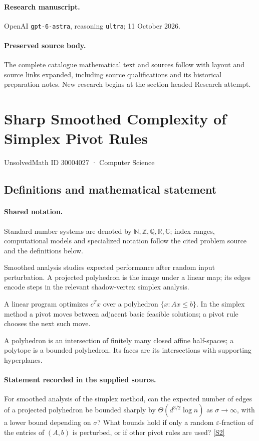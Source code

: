 \documentclass[11pt]{article}
\begin{document}
\paragraph{Research manuscript.} OpenAI \texttt{gpt-6-astra}, reasoning \texttt{ultra}; 11 October 2026.
\paragraph{Preserved source body.} The complete catalogue mathematical text and sources follow with layout and source links expanded, including source qualifications and its historical preparation notes. New research begins at the section headed Research attempt.

\section{Sharp Smoothed Complexity of Simplex Pivot Rules}\label{30004027}
{\small UnsolvedMath ID 30004027 · Computer Science}
\subsection{Definitions and mathematical statement}

\paragraph{Shared notation.}Standard number systems are denoted by $\mathbb N,\mathbb Z,\mathbb Q,\mathbb R,\mathbb C$; index ranges, computational models and specialized notation follow the cited problem source and the definitions below.


Smoothed analysis studies expected performance after random input perturbation. A projected polyhedron is the image under a linear map; its edges encode steps in the relevant shadow-vertex simplex analysis.

A linear program optimizes $c^Tx$ over a polyhedron $\{x:Ax\leq b\}$. In the simplex method a pivot moves between adjacent basic feasible solutions; a pivot rule chooses the next such move.

A polyhedron is an intersection of finitely many closed affine half-spaces; a polytope is a bounded polyhedron. Its faces are its intersections with supporting hyperplanes.
\paragraph{Statement recorded in the supplied source.}
For smoothed analysis of the simplex method, can the expected number of edges of a projected polyhedron be bounded sharply by $\Theta(d^{3/2}\log n)$ as $\sigma\to\infty$, with a lower bound depending on $\sigma$? What bounds hold if only a random $\varepsilon$-fraction of the entries of $(A,b)$ is perturbed, or if other pivot rules are used? \href{https://doi.org/10.4171/owr/2018/54}{[S2]}
\end{document}
